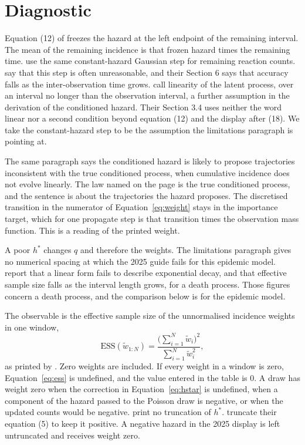 \section{Diagnostic}
\label{sec:diagnostic}

Equation (12) of \citet{whitaker2025} freezes the hazard at the left endpoint of the remaining interval. The mean of the remaining incidence is that frozen hazard times the remaining time. \citet[Section 3.1]{golightly2015} use the same constant-hazard Gaussian step for remaining reaction counts. \citet[Section 3.2]{golightly2019} say that this step is often unreasonable, and their Section 6 says that accuracy falls as the inter-observation time grows. \citet[p.~25]{whitaker2025} call linearity of the latent process, over an interval no longer than the observation interval, a further assumption in the derivation of the conditioned hazard. Their Section 3.4 uses neither the word linear nor a second condition beyond equation (12) and the display after (18). We take the constant-hazard step to be the assumption the limitations paragraph is pointing at.

The same paragraph says the conditioned hazard is likely to propose trajectories inconsistent with the true conditioned process, when cumulative incidence does not evolve linearly. The law named on the page is the true conditioned process, and the sentence is about the trajectories the hazard proposes. The discretised transition in the numerator of Equation~\eqref{eq:weight} stays in the importance target, which for one propagate step is that transition times the observation mass function. This is a reading of the printed weight.

A poor \(h^{*}\) changes \(q\) and therefore the weights. The limitations paragraph gives no numerical spacing at which the 2025 guide fails for this epidemic model. \citet[Section 5.1]{golightly2019} report that a linear form fails to describe exponential decay, and that effective sample size falls as the interval length grows, for a death process. Those figures concern a death process, and the comparison below is for the epidemic model.

The observable is the effective sample size of the unnormalised incidence weights in one window,
\begin{equation}
\label{eq:ess}
\mathrm{ESS}(\tilde w_{1:N})
= \frac{\bigl(\sum_{i=1}^{N} \tilde w_i\bigr)^2}{\sum_{i=1}^{N} \tilde w_i^2},
\end{equation}
as printed by \citet[Section 5.2]{golightly2019}. Zero weights are included. If every weight in a window is zero, Equation~\eqref{eq:ess} is undefined, and the value entered in the table is 0. A draw has weight zero when the correction in Equation~\eqref{eq:hstar} is undefined, when a component of the hazard passed to the Poisson draw is negative, or when the updated counts would be negative. \citet{whitaker2025} print no truncation of \(h^{*}\). \citet[Section 3.2]{golightly2019} truncate their equation (5) to keep it positive. A negative hazard in the 2025 display is left untruncated and receives weight zero.

